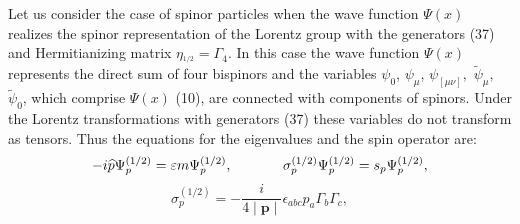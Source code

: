 \documentclass[a4paper,12pt]{article}
\begin{document}
Let us consider the case of spinor particles when the wave
function $\Psi (x) $ realizes the spinor representation of the
Lorentz group with the generators (37) and Hermitianizing matrix
$\eta _{^{1/2}}=\Gamma _4$. In this case the wave function $\Psi
(x)$ represents the direct sum of four bispinors and the variables
$\psi _0$, $\psi _\mu $, $\psi _{[\mu \nu ]},$ $ \widetilde{\psi
}_\mu ,$ $\widetilde{\psi }_0$, which comprise $\Psi (x)$ (10),
are connected with components of spinors. Under the Lorentz
transformations with generators (37) these variables do not
transform as tensors. Thus the equations for the eigenvalues and
the spin operator are:
\[
-i\widehat{p}\Psi _p^{(1/2)}=\varepsilon m\Psi _p^{(1/2)} ,
\hspace{0.5in} \sigma _p^{(1/2)}\Psi _p^{(1/2)}=s_p\Psi _p^{(1/2)}
,
\]
\vspace{-8mm}
\begin{equation}  \label{50}
\end{equation}
\vspace{-8mm}
\[
\sigma _p^{(1/2)}=-\frac i{4\mid \mathbf{p}\mid }\epsilon
_{abc}p_a\Gamma _b\Gamma _c ,
\]
\end{document}
